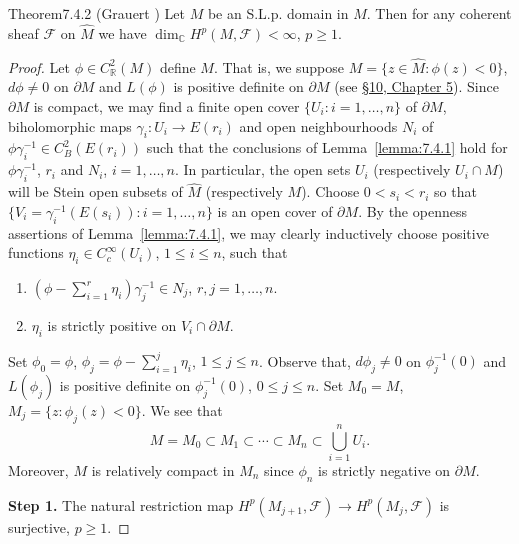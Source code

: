 \begin{originaltheorem}{Theorem}{7.4.2 (Grauert \cite{bib:II:grauert-h:3})}
Let $M$ be an S.L.p. domain in $\widehat M$. Then for any coherent sheaf $\mathcal F$ on $\widehat M$ we have $\dim_{\mathbb C}H^p(M,\mathcal F)<\infty$, $p\geq1$.
\end{originaltheorem}
\begin{proof}
Let $\phi\in C_{\mathbb R}^2(M)$ define $M$. That is, we suppose $M=\{z\in\widehat M:\phi(z)<0\}$, $d\phi\ne0$ on $\partial M$ and $L(\phi)$ is positive definite on
$\partial M$ (see \hyperref[sec:5:10]{\S10, Chapter 5}). Since $\partial M$ is compact, we may find a finite open cover $\{U_i:i=1,\ldots,n\}$ of $\partial M$, biholomorphic maps $\gamma_i:U_i\to E(r_i)$ and open neighbourhoods $N_i$ of $\phi\gamma_i^{-1}\in C_B^2(E(r_i))$ such that the conclusions of Lemma~\ref{lemma:7.4.1} hold for $\phi\gamma_i^{-1}$, $r_i$ and $N_i$, $i=1,\ldots,n$. In particular, the open sets $U_i$ (respectively $U_i\cap M$) will be Stein open subsets of $\widehat M$ (respectively $M$). Choose $0<s_i<r_i$ so that $\{V_i=\gamma_i^{-1}(E(s_i)):i=1,\ldots,n\}$ is an open cover of $\partial M$. By the openness assertions of Lemma~\ref{lemma:7.4.1}, we may clearly inductively choose positive functions $\eta_i\in C_c^\infty(U_i)$, $1\leq i\leq n$, such that
\begin{enumerate}[label=\arabic*.]
\item $(\phi-\sum_{i=1}^r\eta_i)\gamma_j^{-1}\in N_j$, $r,j=1,\ldots,n$.
\item $\eta_i$ is strictly positive on $V_i\cap\partial M$.
\end{enumerate}
Set $\phi_0=\phi$, $\phi_j=\phi-\sum_{i=1}^j\eta_i$, $1\leq j\leq n$. Observe that, $d\phi_j\ne0$ on $\phi_j^{-1}(0)$ and $L(\phi_j)$ is positive definite on $\phi_j^{-1}(0)$, $0\leq j\leq n$. Set $M_0=M$, $M_j=\{z:\phi_j(z)<0\}$. We see that
\[
M=M_0\subset M_1\subset\cdots\subset M_n\subset\bigcup_{i=1}^n U_i.
\]
Moreover, $M$ is relatively compact in $M_n$ since $\phi_n$ is strictly negative on $\partial M$.

\textbf{Step 1.} The natural restriction map $H^p(M_{j+1},\mathcal F)\to H^p(M_j,\mathcal F)$ is surjective, $p\geq1$.


\end{proof}
